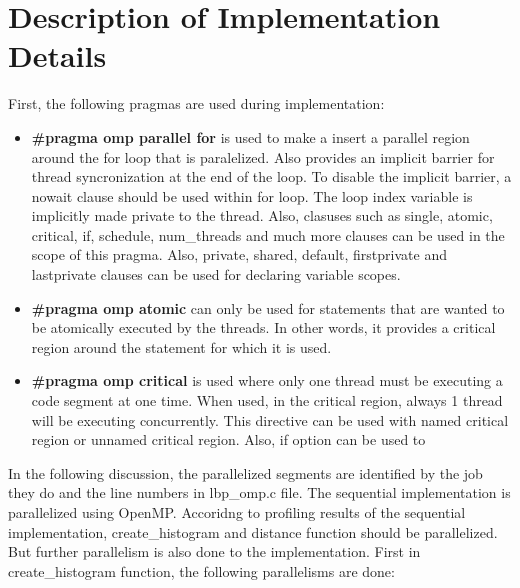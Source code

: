 \documentclass{article}
\begin{document}
\section{Description of Implementation Details}
\qquad First, the following pragmas are used during implementation:
\begin{itemize}
    \item \textbf{\#pragma omp parallel for} is used to make a insert a parallel region around the for loop that is paralelized. Also provides an implicit barrier for thread syncronization at the end of the loop. To disable the implicit barrier, a nowait clause should be used within for loop. The loop index variable is implicitly made private to the thread. Also, clasuses such as single, atomic, critical, if, schedule, num\_threads and much more clauses can be used in the scope of this pragma. Also, private, shared, default, firstprivate and lastprivate clauses can be used for declaring variable scopes.
    \item \textbf{\#pragma omp atomic} can only be used for statements that are wanted to be atomically executed by the threads. In other words, it provides a critical region around the statement for which it is used.
    \item \textbf{\#pragma omp critical} is used where only one thread must be executing a code segment at one time. When used, in the critical region, always 1 thread will be executing concurrently. This directive can be used with named critical region or unnamed critical region. Also, if option can be used to 
\end{itemize}
\qquad  In the following discussion, the parallelized segments are identified by the job they do and the line numbers in lbp\_omp.c file. The sequential implementation is parallelized using OpenMP. Accoridng to profiling results of the sequential implementation, create\_histogram and distance function should be parallelized. But further parallelism is also done to the implementation. First in create\_histogram function, the following parallelisms are done:
\end{document}
